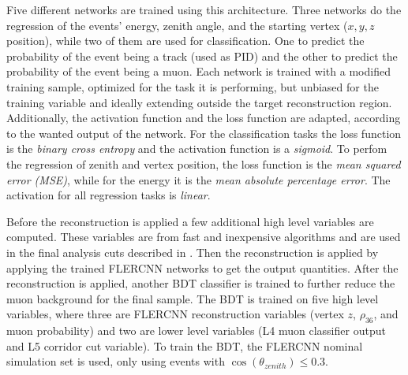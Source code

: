 Five different networks are trained using this architecture. Three networks do the regression of the events' energy, zenith angle, and the starting vertex ($x,y,z$ position), while two of them are used for classification. One to predict the probability of the event being a track (used as PID) and the other to predict the probability of the event being a muon. Each network is trained with a modified training sample, optimized for the task it is performing, but unbiased for the training variable and ideally extending outside the target reconstruction region. Additionally, the activation function and the loss function are adapted, according to the wanted output of the network. For the classification tasks the loss function is the \textit{binary cross entropy} and the activation function is a \textit{sigmoid}. To perfom the regression of zenith and vertex position, the loss function is the \textit{mean squared error (MSE)}, while for the energy it is the \textit{mean absolute percentage error}. The activation for all regression tasks is \textit{linear}.


Before the reconstruction is applied a few additional high level variables are computed. These variables are from fast and inexpensive algorithms and are used in the final analysis cuts described in . Then the reconstruction is applied by applying the trained FLERCNN networks to get the output quantities. After the reconstruction is applied, another BDT classifier is trained to further reduce the muon background for the final sample. The BDT is trained on five high level variables, where three are FLERCNN reconstruction variables (vertex $z$, $\rho_{36}$, and muon probability) and two are lower level variables (L4 muon classifier output and L5 corridor cut variable). To train the BDT, the FLERCNN nominal simulation set is used, only using events with $\cos(\theta_{zenith})\leq 0.3$.






